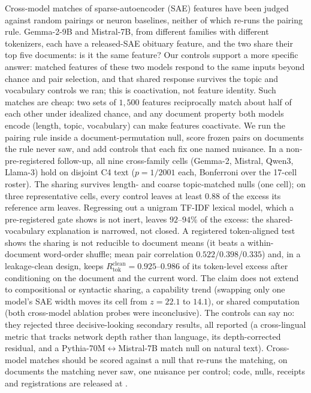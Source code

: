 Cross-model matches of sparse-autoencoder (SAE) features have been judged against random
pairings or neuron baselines, neither of which re-runs the pairing rule. Gemma-2-9B and Mistral-7B,
from different families with different tokenizers, each have a released-SAE obituary feature, and
the two share their top five documents: is it the same feature? Our controls support a more specific answer: matched features of these two models respond
to the same inputs beyond chance and pair selection, and that shared response survives the topic
and vocabulary controls we ran; this is coactivation, not feature identity. Such matches are cheap: two sets of
$1{,}500$ features reciprocally match about half of each other under idealized chance, and any
document property both models encode (length, topic, vocabulary) can make features coactivate. We
run the pairing rule inside a document-permutation null, score frozen pairs on documents the
rule never saw, and add controls that each fix one named nuisance. In a
non-pre-registered follow-up, all nine cross-family cells (Gemma-2, Mistral, Qwen3, Llama-3)
hold on disjoint C4 text ($p=1/2001$ each, Bonferroni over the 17-cell roster). The sharing
survives length- and coarse topic-matched nulls (one cell); on three representative
cells, every control leaves at least $0.88$ of the excess its reference arm leaves. Regressing out a unigram TF-IDF
lexical model, which a pre-registered gate shows is not inert, leaves $92$--$94\%$ of the
excess: the shared-vocabulary explanation is narrowed, not closed. A registered token-aligned
test shows the sharing is not reducible to document means (it beats a within-document
word-order shuffle; mean pair correlation $0.522$/$0.398$/$0.335$) and, in a leakage-clean design, keeps
$R_{\text{tok}}^{\text{clean}}{=}0.925$--$0.986$ of its token-level excess after conditioning on
the document and the current word. The claim does not extend to compositional or syntactic
sharing, a capability trend (swapping only one model's SAE width
moves its cell from $z=22.1$ to $14.1$), or shared computation (both cross-model
ablation probes were inconclusive). The controls can say no: they rejected three decisive-looking
secondary results, all reported (a cross-lingual metric that tracks network depth rather than
language, its depth-corrected residual, and a Pythia-70M$\leftrightarrow$Mistral-7B match null on natural text).
Cross-model matches should be scored against a null that re-runs the matching, on documents
the matching never saw, one nuisance per control; code, nulls, receipts and
registrations are released at \coderepo.
